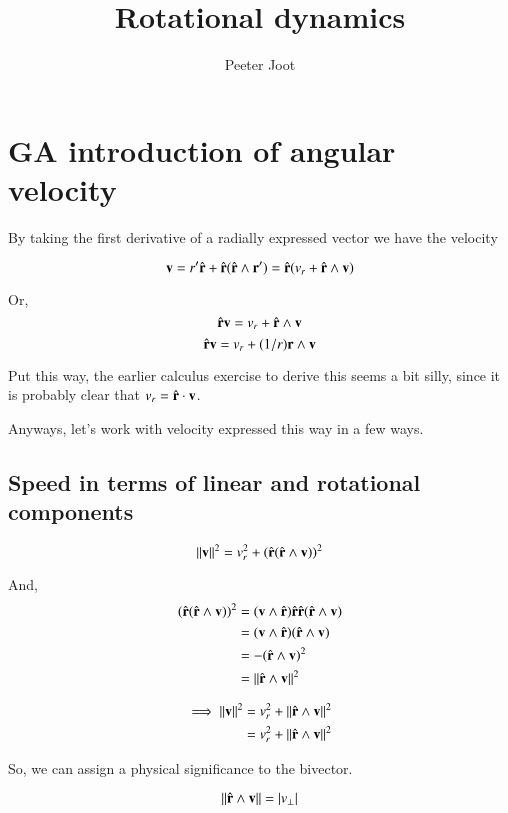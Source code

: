 \documentclass{article}      %
\title{Rotational dynamics}
\author{Peeter Joot}         %
\newcommand{\Norm}[1]{\left\lVert{#1}\right\rVert}
\begin{document}

\maketitle{}

\section{GA introduction of angular velocity}

By taking the first derivative of a radially expressed vector we have the velocity 

\[
\mathbf{v} 
   = r'\hat{\mathbf{r}} + \hat{\mathbf{r}}(\hat{\mathbf{r}} \wedge \mathbf{r}')
   = \hat{\mathbf{r}}( v_r + \hat{\mathbf{r}} \wedge \mathbf{v} )
\]

Or,
\[
\hat{\mathbf{r}} \mathbf{v} = v_r + \hat{\mathbf{r}} \wedge \mathbf{v}
\]
\[
\hat{\mathbf{r}} \mathbf{v} = v_r + (1/r)\mathbf{r} \wedge \mathbf{v}
\]

Put this way, the earlier calculus exercise to derive this seems a bit silly, since it is probably clear that $v_r = \hat{\mathbf{r}} \cdot \mathbf{v}$.

Anyways, let's work with velocity expressed this way in a few ways.

\subsection{Speed in terms of linear and rotational components}

\[
\Norm{\Bv}^2 = v_r^2 + (\rcap(\rcap \wedge \Bv))^2
\]

And,
\begin{align*}
(\rcap(\rcap \wedge \Bv))^2 
   &= (\Bv \wedge \rcap)\rcap \rcap(\rcap \wedge \Bv) \\
   &= (\Bv \wedge \rcap)(\rcap \wedge \Bv) \\
   &= -(\rcap \wedge \Bv)^2 \\
   &= \Norm{\rcap \wedge \Bv}^2 \\
\end{align*}

\begin{align*}
\implies
\Norm{\Bv}^2 &= v_r^2 + \Norm{\rcap \wedge \Bv}^2 \\
             &= v_r^2 + \Norm{\rcap \wedge \Bv}^2 \\
\end{align*}

So, we can assign a physical significance to the bivector.

\[
\Norm{\rcap \wedge \Bv} = \abs{v_{\perp}} 
\]
\end{document}

